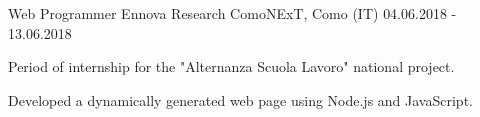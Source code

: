 
\cventry
{Web Programmer}
{Ennova Research}
{ComoNExT, Como (IT)}
{04.06.2018 - 13.06.2018}
{
    \begin{cvitems}
        \item {Period of internship for the "Alternanza Scuola Lavoro" national project.}
        \item {Developed a dynamically generated web page using Node.js and JavaScript.}
    \end{cvitems}
}